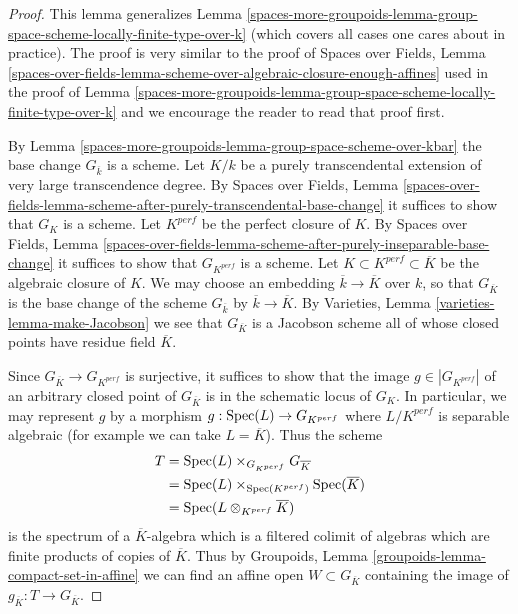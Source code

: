 \begin{proof}
This lemma generalizes
Lemma \ref{spaces-more-groupoids-lemma-group-space-scheme-locally-finite-type-over-k}
(which covers all cases one cares about in practice).
The proof is very similar to the proof of
Spaces over Fields, Lemma
\ref{spaces-over-fields-lemma-scheme-over-algebraic-closure-enough-affines}
used in the proof of
Lemma \ref{spaces-more-groupoids-lemma-group-space-scheme-locally-finite-type-over-k}
and we encourage the reader to read that proof first.

\medskip\noindent
By Lemma \ref{spaces-more-groupoids-lemma-group-space-scheme-over-kbar} the base
change $G_{\overline{k}}$ is a scheme.
Let $K/k$ be a purely transcendental extension of very large
transcendence degree. By Spaces over Fields, Lemma
\ref{spaces-over-fields-lemma-scheme-after-purely-transcendental-base-change}
it suffices to show that $G_K$ is a scheme.
Let $K^{perf}$ be the perfect closure of $K$. By
Spaces over Fields, Lemma
\ref{spaces-over-fields-lemma-scheme-after-purely-inseparable-base-change}
it suffices to show that $G_{K^{perf}}$ is a scheme.
Let $K \subset K^{perf} \subset \overline{K}$ be the algebraic closure
of $K$. We may choose an embedding $\overline{k} \to \overline{K}$ over
$k$, so that $G_{\overline{K}}$ is the base change of the scheme
$G_{\overline{k}}$ by $\overline{k} \to \overline{K}$. By
Varieties, Lemma \ref{varieties-lemma-make-Jacobson}
we see that $G_{\overline{K}}$ is a Jacobson scheme all of whose
closed points have residue field $\overline{K}$.

\medskip\noindent
Since $G_{\overline{K}} \to G_{K^{perf}}$ is surjective, it suffices to
show that the image $g \in |G_{K^{perf}}|$ of an arbitrary closed point of
$G_{\overline{K}}$ is in the schematic locus of $G_K$.
In particular, we may represent $g$ by a morphism
$g : \operatorname{Spec}(L) \to G_{K^{perf}}$ where $L/K^{perf}$ is separable algebraic
(for example we can take $L = \overline{K}$). Thus the scheme
\begin{align*}
T & = \operatorname{Spec}(L) \times_{G_{K^{perf}}} G_{\overline{K}} \\
& =
\operatorname{Spec}(L) \times_{\operatorname{Spec}(K^{perf})} \operatorname{Spec}(\overline{K}) \\
& =
\operatorname{Spec}(L \otimes_{K^{perf}} \overline{K})
\end{align*}
is the spectrum of a $\overline{K}$-algebra which is a filtered colimit
of algebras which are finite products of copies of $\overline{K}$.
Thus by Groupoids, Lemma \ref{groupoids-lemma-compact-set-in-affine}
we can find an affine open $W \subset G_{\overline{K}}$ containing
the image of $g_{\overline{K}} : T \to G_{\overline{K}}$.


\end{proof}
